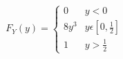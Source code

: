 \documentclass{article}
\begin{document}
\[
	F_Y(y) = \begin{cases}
		0 & y<0\\
		8y^3 & y \epsilon [0, \frac{1}{2} ]\\
		1 & y>\frac{1}{2}
	\end{cases}
\]
\end{document}
